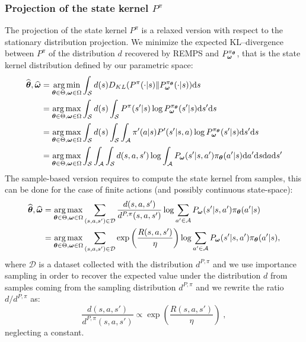 \subsubsection{Projection of the state kernel $P^{\pi}$}
The projection of the state kernel $P^{\pi}$ is a relaxed version with respect to the stationary distribution projection.
We minimize the expected KL--divergence between $P^{\pi}$ of the distribution $d$ recovered by REMPS and $P_{\bm{\mathbf{\omega}}}^{\pi_{\bm{\mathbf{\theta}}}}$, that is the state kernel distribution defined by our parametric space:
\begin{align*}
	\widehat{\bm{\mathbf{\theta}}}, \widehat{\bm{\mathbf{\omega}}} & = \operatorname*{arg\,min}_{\bm{\mathbf{\theta}} \in \Theta, \bm{\mathbf{\omega}} \in \Omega} \int_{\mathcal{S}} d(s) D_{KL} (P^{\pi}(\cdot|s) \| P_{\bm{\mathbf{\omega}}}^{\pi_{\bm{\mathbf{\theta}}}}(\cdot|s)) \mathrm{d}s \\
    & = \operatorname*{arg\,max}_{\bm{\mathbf{\theta}} \in \Theta, \bm{\mathbf{\omega}} \in \Omega} \int_{\mathcal{S}} d(s) \int_{\mathcal{S}} P^{\pi}(s'|s) \log P_{\bm{\mathbf{\omega}}}^{\pi_{\bm{\mathbf{\theta}}}}(s'|s) \mathrm{d}s' \mathrm{d}s \\
    & = \operatorname*{arg\,max}_{\bm{\mathbf{\theta}} \in \Theta, \bm{\mathbf{\omega}} \in \Omega} \int_{\mathcal{S}} d(s) \int_{\mathcal{S}} \int_{\mathcal{A}} \pi'(a|s)P'(s'|s, a) \log P_{\bm{\mathbf{\omega}}}^{\pi_{\bm{\mathbf{\theta}}}}(s'|s) \mathrm{d}s' \mathrm{d}s \\
    & = \operatorname*{arg\,max}_{\bm{\mathbf{\theta}} \in \Theta, \bm{\mathbf{\omega}} \in \Omega} \int_{\mathcal{S}}\int_{\mathcal{A}}\int_{\mathcal{S}} d(s,a,s') \log \int_{\mathcal{A}} P_{\bm{\mathbf{\omega}}}(s'|s,a') \pi_{\bm{\mathbf{\theta}}}(a'|s) \mathrm{d}a' \mathrm{d}s \mathrm{d}a \mathrm{d}s'
\end{align*}
The sample-based version requires to compute the state kernel from samples, this can be done for the case of finite actions (and possibly continuous state-space):
\begin{align*}
	\widehat{\bm{\mathbf{\theta}}}, \widehat{\bm{\mathbf{\omega}}} & = \operatorname*{arg\,max}_{\bm{\mathbf{\theta}} \in \Theta, \bm{\mathbf{\omega}} \in \Omega} \sum_{(s,a,s') \in \mathcal{D}} \frac{d(s,a,s')}{d^{P,\pi}(s,a,s')} \log \sum_{a' \in \mathcal{A}} P_{\bm{\mathbf{\omega}}}(s'|s,a') \pi_{\bm{\mathbf{\theta}}}(a'|s) \\
& = \operatorname*{arg\,max}_{\bm{\mathbf{\theta}} \in \Theta, \bm{\mathbf{\omega}} \in \Omega} \sum_{(s,a,s') \in \mathcal{D}} \exp\left(\frac{R
(s,a,s')}{\eta} \right)  \log \sum_{a' \in \mathcal{A}} P_{\bm{\mathbf{\omega}}}(s'|s,a') \pi_{\bm{\mathbf{\theta}}}(a'|s) ,
\end{align*}
where $\mathcal{D}$ is a dataset collected with the distribution $d^{P,\pi}$ and we use importance sampling in order to recover the expected value under the distribution $d$ from samples coming from the sampling distribution $d^{P,\pi}$ and we rewrite the ratio $d/d^{P,\pi}$ as:
$$
 \frac{d(s,a,s')}{d^{P,\pi}(s,a,s')} \propto \exp\left(\frac{R
(s,a,s')}{\eta}\right) \; ,
$$
neglecting a constant.
